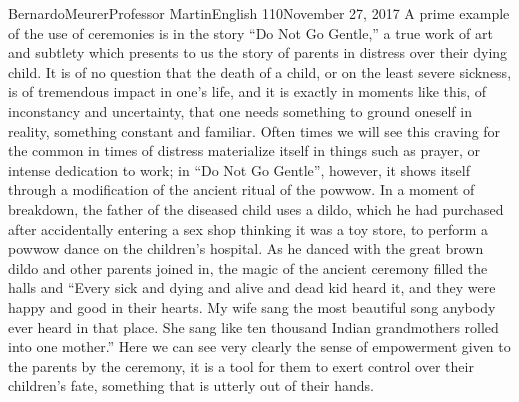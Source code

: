 \documentclass[12pt,letterpaper]{article}
\begin{document}
\begin{mla}{Bernardo}{Meurer}{Professor Martin}{English 110}{November 27, 2017}
        A prime example of the use of ceremonies is in the story ``Do Not Go Gentle,'' a true work of art and subtlety which presents to us the story of parents in distress over their dying child. It is of no question that the death of a child, or on the least severe sickness, is of tremendous impact in one's life, and it is exactly in moments like this, of inconstancy and uncertainty, that one needs something to ground oneself in reality, something constant and familiar. Often times we will see this craving for the common in times of distress materialize itself in things such as prayer, or intense dedication to work; in ``Do Not Go Gentle'', however, it shows itself through a modification of the ancient ritual of the powwow. In a moment of breakdown, the father of the diseased child uses a dildo, which he had purchased after accidentally entering a sex shop thinking it was a toy store, to perform a powwow dance on the children's hospital. As he danced with the great brown dildo and other parents joined in, the magic of the ancient ceremony filled the halls and ``Every sick and dying and alive and dead kid heard it, and they were happy and good in their hearts. My wife sang the most beautiful song anybody ever heard in that place. She sang like ten thousand Indian grandmothers rolled into one mother.'' Here we can see very clearly the sense of empowerment given to the parents by the ceremony, it is a tool for them to exert control over their children's fate, something that is utterly out of their hands.


\end{mla}
\end{document}
